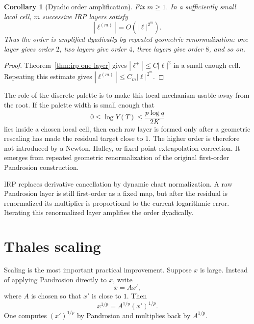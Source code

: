 \documentclass[10pt,a4paper]{article}
\theoremstyle{plain}
\newtheorem{corollary}[theorem]{Corollary}
\theoremstyle{definition}
\theoremstyle{remark}
\newenvironment{takeaway}{%
  \begin{center}\begin{minipage}{0.92\linewidth}\small\itshape\color{blue!45!black}%
}{%
  \end{minipage}\end{center}%
}
\begin{document}
\begin{corollary}[Dyadic order amplification]
\label{cor:dyadic-irp}
Fix $m\ge1$.  In a sufficiently small local cell, $m$ successive IRP layers
satisfy
\[
  |\ell^{(m)}|=O(|\ell|^{2^m}).
\]
Thus the order is amplified dyadically by repeated geometric renormalization:
one layer gives order $2$, two layers give order $4$, three layers give order
$8$, and so on.
\end{corollary}

\begin{proof}
Theorem~\ref{thm:irp-one-layer} gives $|\ell^+|\le C|\ell|^2$ in a small enough
cell.  Repeating this estimate gives
$|\ell^{(m)}|\le C_m |\ell|^{2^m}$.
\end{proof}

The role of the discrete palette is to make this local mechanism usable away
from the root.  If the palette width is small enough that
\[
  0\le \log Y(T)\le \frac{p\log q}{2K}
\]
lies inside a chosen local cell, then each raw layer is formed only after a
geometric rescaling has made the residual target close to $1$.  The higher
order is therefore not introduced by a Newton, Halley, or fixed-point extrapolation
correction.  It emerges from repeated geometric renormalization of the original
first-order Pandrosion construction.

\begin{takeaway}
IRP replaces derivative cancellation by dynamic chart normalization.  A raw
Pandrosion layer is still first-order as a fixed map, but after the residual is
renormalized its multiplier is proportional to the current logarithmic error.
Iterating this renormalized layer amplifies the order dyadically.
\end{takeaway}

\section{Thales scaling}
\label{sec:scaling}

Scaling is the most important practical improvement.  Suppose $x$ is large.
Instead of applying Pandrosion directly to $x$, write
\begin{equation}
  x=A x',
  \label{eq:scaling-factor}
\end{equation}
where $A$ is chosen so that $x'$ is close to $1$.  Then
\[
  x^{1/p}=A^{1/p}(x')^{1/p}.
\]
One computes $(x')^{1/p}$ by Pandrosion and multiplies back by $A^{1/p}$.
\end{document}
